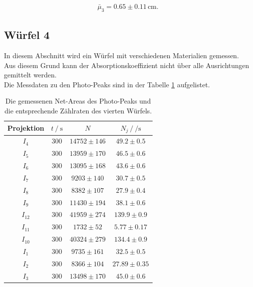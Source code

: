 \begin{align}
  \bar{\mu}_3 = 0.65\pm0.11 \,\si{\centi\metre}.
\end{align}

\subsection{Würfel 4}

In diesem Abschnitt wird ein Würfel mit verschiedenen Materialien gemessen. Aus diesem Grund kann der Absorptionskoeffizient nicht über alle Ausrichtungen gemittelt werden. \\
Die Messdaten zu den Photo-Peaks sind in der Tabelle \ref{tab:w4} aufgelistet. 
\begin{table}[H]
  \centering
  \begin{tabular}{c c c c}
    \toprule
    Projektion &  $t \:/\: \si{\second}$ &     $N$ &           $N_j \:/\: \si{\per\second}$ \\
    \midrule
        $I_{  4}$ &   $300$ & $14752 \pm     146$ & $  49.2\pm0.5$ \\
        $I_{  5}$ &   $300$ & $13959 \pm     170$ & $  46.5\pm0.6$ \\
        $I_{  6}$ &   $300$ & $13095 \pm     168$ & $  43.6\pm0.6$ \\
        $I_{  7}$ &   $300$ & $ 9203 \pm     140$ & $  30.7\pm0.5$ \\
        $I_{  8}$ &   $300$ & $ 8382 \pm     107$ & $  27.9\pm0.4$ \\
        $I_{  9}$ &   $300$ & $11430 \pm     194$ & $  38.1\pm0.6$ \\
        $I_{ 12}$ &   $300$ & $41959 \pm     274$ & $ 139.9\pm0.9$ \\
        $I_{ 11}$ &   $300$ & $ 1732 \pm      52$ & $  5.77\pm0.17$ \\
        $I_{ 10}$ &   $300$ & $40324 \pm     279$ & $ 134.4\pm0.9$ \\
        $I_{  1}$ &   $300$ & $ 9735 \pm     161$ & $  32.5\pm0.5$ \\
        $I_{  2}$ &   $300$ & $ 8366 \pm     104$ & $ 27.89\pm0.35$ \\
        $I_{  3}$ &   $300$ & $13498 \pm     170$ & $  45.0\pm0.6$ \\
      \bottomrule
  \end{tabular}
  \caption{Die gemessenen Net-Areas des Photo-Peaks und die entsprechende Zählraten des vierten Würfels. }
  \label{tab:w4}
\end{table}

